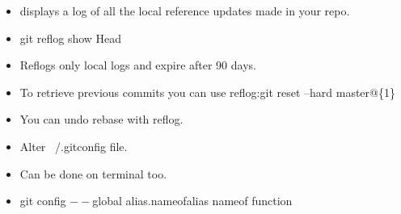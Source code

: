 \documentclass[landscape,a0paper,fontscale=0.285]{baposter} %
\newcommand{\compresslist}{ %
\setlength{\itemsep}{1pt}
\setlength{\parskip}{0pt}
\setlength{\parsep}{0pt}
}
\begin{document}
{\begin{poster}
{\begin{itemize}
\end{itemize}

\colorbox[HTML]{A3C1AD}{}
\begin{itemize}\compresslist
\item displays a log of all the local reference updates made in your repo.
\item git reflog show Head
\item Reflogs only local logs and expire after 90 days.
\item To retrieve previous commits you can use reflog:git reset –hard master@\{1\}
\item You can undo rebase with reflog.	


\end{itemize}

\colorbox[HTML]{A3C1AD}{}
\begin{itemize}\compresslist
\item Alter ~/.gitconfig file. 
\item Can be done on terminal too. 
\item git config ${--}$global alias.nameofalias nameof function


\end{itemize}


}





\end{poster}}
\end{document}

